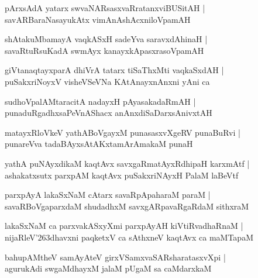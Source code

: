 \documentclass[twoside,12pt,openright]{book}
\def\S{\char'263}
\newcounter{shloka}[chapter]
\begin{document}
\begin{shloka}%
pArxsAdA yatarx swvaNARsasxvaRratanxviBUSitAH |\\
savARBaraNasayukAtx vimAnAshAcxniloVpamAH
\end{shloka}

\begin{shloka}%
shAtakuMbamayA vaqkASxH sadeYva saravxdAhinaH |\\
savaRtuRsuKadA swmAyx kanayxkApasxrasoVpamAH 
\end{shloka}

\begin{shloka}%
giVtanaqtayxparA dhiVrA tatarx tiSaThxMti vaqkaSxdAH |\\
puSakxriNoyxV visheVSeVNa KAtAnayxnAnxni yAni ca 
\end{shloka}

\begin{shloka}%
sudhoVpalAMtaracitA nadayxH pAyasakadaRmAH |\\
punaduRgadhxsaPeVnAShacx anAnxdiSaDarxsAnivxtAH 
\end{shloka}

\begin{shloka}%
matayxRloVkeV yathABoVgayxM punasasxvXgeRV punaBuRvi |\\
punareVva tadaBAyxsAtAKxtamArAmakaM punaH 
\end{shloka}

\begin{shloka}%
yathA puNAyxdikaM kaqtAvx savxgaRmatAyxRdhipaH karxmAtf |\\
ashakatxsutx parxpAM kaqtAvx puSakxriNAyxH PalaM laBeVtf
\end{shloka}

\begin{shloka}%
parxpAyA lakaSxNaM cAtarx savaRpApaharaM paraM |\\
savaRBoVgaparxdaM shudadhxM savxgARpavaRgaRdaM sithxraM 
\end{shloka}

\begin{shloka}%
lakaSxNaM ca parxvakASxyXmi parxpAyAH kiVtiRvadhaRnaM |\\
nijaRleV\S dhavxni paqketxV ca sAthxneV kaqtAvx ca maMTapaM 
\end{shloka}

\begin{shloka}%
bahupAMtheV samAyAteV girxVSamxvaSARsharatasxvXpi |\\
agurukAdi swgaMdhayxM jalaM pUgaM sa caMdarxkaM
\end{shloka}
\end{document}
